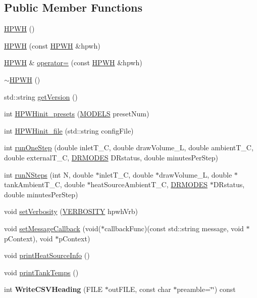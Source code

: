 \subsection*{Public Member Functions}
\begin{DoxyCompactItemize}
\item 
\hyperlink{class_h_p_w_h_a07cd672278715ee61604ae26137d16f7}{H\-P\-W\-H} ()
\item 
\hyperlink{class_h_p_w_h_aa28907ae69a5f53e53bb14554c9af73f}{H\-P\-W\-H} (const \hyperlink{class_h_p_w_h}{H\-P\-W\-H} \&hpwh)
\item 
\hyperlink{class_h_p_w_h}{H\-P\-W\-H} \& \hyperlink{class_h_p_w_h_a6e231a8737d540f89aeeb028663f65a9}{operator=} (const \hyperlink{class_h_p_w_h}{H\-P\-W\-H} \&hpwh)
\item 
\hyperlink{class_h_p_w_h_ad92e11f51e981157e85ac8855269d50a}{$\sim$\-H\-P\-W\-H} ()
\item 
std\-::string \hyperlink{class_h_p_w_h_a001c10815863cb3efdb721d364111275}{get\-Version} ()
\item 
int \hyperlink{class_h_p_w_h_a74b3a6c1352adb5d38e7c00ad5952f30}{H\-P\-W\-Hinit\-\_\-presets} (\hyperlink{class_h_p_w_h_acf117eb928a21b7b757b653455a2338e}{M\-O\-D\-E\-L\-S} preset\-Num)
\item 
int \hyperlink{class_h_p_w_h_a348c1c4a90ec1ee5e91c84ab8d3bc5b1}{H\-P\-W\-Hinit\-\_\-file} (std\-::string config\-File)
\item 
int \hyperlink{class_h_p_w_h_aef8f08c0115787826a64b34897468b45}{run\-One\-Step} (double inlet\-T\-\_\-\-C, double draw\-Volume\-\_\-\-L, double ambient\-T\-\_\-\-C, double external\-T\-\_\-\-C, \hyperlink{class_h_p_w_h_a6a74814715ed6a33a75fd0d9dc3e7107}{D\-R\-M\-O\-D\-E\-S} D\-Rstatus, double minutes\-Per\-Step)
\item 
int \hyperlink{class_h_p_w_h_a904e3a0f6bdd7eaaeed43839bac779fc}{run\-N\-Steps} (int N, double $\ast$inlet\-T\-\_\-\-C, double $\ast$draw\-Volume\-\_\-\-L, double $\ast$tank\-Ambient\-T\-\_\-\-C, double $\ast$heat\-Source\-Ambient\-T\-\_\-\-C, \hyperlink{class_h_p_w_h_a6a74814715ed6a33a75fd0d9dc3e7107}{D\-R\-M\-O\-D\-E\-S} $\ast$D\-Rstatus, double minutes\-Per\-Step)
\item 
void \hyperlink{class_h_p_w_h_a7c81dfc13de82ce9ca01300bde0d4b22}{set\-Verbosity} (\hyperlink{class_h_p_w_h_aa493e3f78affa7dafde7e297cc68673c}{V\-E\-R\-B\-O\-S\-I\-T\-Y} hpwh\-Vrb)
\item 
void \hyperlink{class_h_p_w_h_af20440c49f36a44b66b82d16b0b6a74b}{set\-Message\-Callback} (void($\ast$callback\-Func)(const std\-::string message, void $\ast$p\-Context), void $\ast$p\-Context)
\item 
void \hyperlink{class_h_p_w_h_a49d923bea7be1ad1ee60c02163bbf6cc}{print\-Heat\-Source\-Info} ()
\item 
void \hyperlink{class_h_p_w_h_a59d5b765bf4490be7bd5954a5ab7324e}{print\-Tank\-Temps} ()
\item 
\hypertarget{class_h_p_w_h_ac8bced7dc05598df491f907cd895ccaa}{int {\bfseries Write\-C\-S\-V\-Heading} (F\-I\-L\-E $\ast$out\-F\-I\-L\-E, const char $\ast$preamble=\char`\"{}\char`\"{}) const }\label{class_h_p_w_h_ac8bced7dc05598df491f907cd895ccaa}


\end{DoxyCompactItemize}
